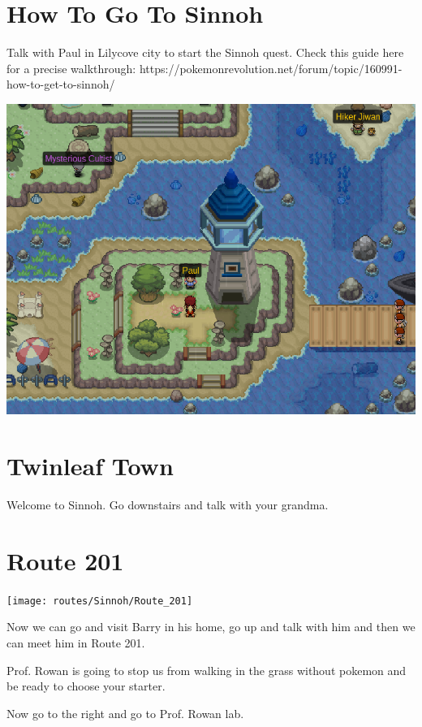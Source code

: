 \documentclass[11pt]{article}
\begin{document}
\pagecolor{LightColor}

\section{How To Go To Sinnoh}\label{sec:how-to-go-to-sinnoh}
Talk with Paul in Lilycove city to start the Sinnoh quest.
Check this guide here for a precise walkthrough:
https://pokemonrevolution.net/forum/topic/160991-how-to-get-to-sinnoh/

\includegraphics[width=\textwidth]{walkthrough/Sinnoh/paul-lilycove}

\section{Twinleaf Town}\label{sec:twinleaf-town}
Welcome to Sinnoh.
Go downstairs and talk with your grandma.

\section{Route 201}\label{sec:Route_201}
\texttt{[image: routes/Sinnoh/Route\_201]}

Now we can go and visit Barry in his home, go up and talk with him
and then we can meet him in Route 201.

Prof. Rowan is going to stop us from walking in the grass without pokemon
and be ready to choose your starter.

Now go to the right and go to Prof. Rowan lab.


\end{document}
